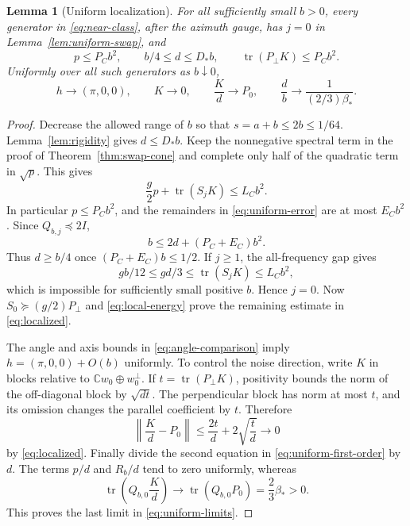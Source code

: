 \documentclass[11pt]{article}
\newtheorem{lemma}[theorem]{Lemma}
\theoremstyle{definition}
\theoremstyle{remark}
\DeclareMathOperator{\tr}{tr}
\newcommand{\C}{\mathbb C}
\begin{document}
\begin{lemma}[Uniform localization]\label{lem:localization}
For all sufficiently small \(b>0\), every generator in \eqref{eq:near-class}, after the azimuth gauge, has \(j=0\) in Lemma~\ref{lem:uniform-swap}, and
\begin{equation}\label{eq:localized}
 p\leq P_Cb^2,\qquad b/4\leq d\leq D_*b,\qquad
 \tr(P_\perp K)\leq P_Cb^2.
\end{equation}
Uniformly over all such generators as \(b\downarrow0\),
\begin{equation}\label{eq:uniform-limits}
 h\longrightarrow(\pi,0,0),\qquad
 K\longrightarrow0,\qquad
 \frac Kd\longrightarrow P_0,\qquad
 \frac db\longrightarrow\frac{1}{(2/3)\beta_*}.
\end{equation}
\end{lemma}
\begin{proof}
Decrease the allowed range of \(b\) so that \(s=a+b\leq2b\leq1/64\). Lemma~\ref{lem:rigidity} gives \(d\leq D_*b\). Keep the nonnegative spectral term in the proof of Theorem~\ref{thm:swap-cone} and complete only half of the quadratic term in \(\sqrt p\). This gives
\begin{equation}\label{eq:local-energy}
 \frac g2p+\tr(S_jK)\leq L_Cb^2.
\end{equation}
In particular \(p\leq P_Cb^2\), and the remainders in \eqref{eq:uniform-error} are at most \(E_Cb^2\). Since \(Q_{b,j}\preceq2I\),
\[
 b\leq2d+(P_C+E_C)b^2.
\]
Thus \(d\geq b/4\) once \((P_C+E_C)b\leq1/2\). If \(j\geq1\), the all-frequency gap gives
\[
 gb/12\leq gd/3\leq\tr(S_jK)\leq L_Cb^2,
\]
which is impossible for sufficiently small positive \(b\). Hence \(j=0\). Now \(S_0\succeq(g/2)P_\perp\) and \eqref{eq:local-energy} prove the remaining estimate in \eqref{eq:localized}.

The angle and axis bounds in \eqref{eq:angle-comparison} imply \(h=(\pi,0,0)+O(b)\) uniformly. To control the noise direction, write \(K\) in blocks relative to \(\C w_0\oplus w_0^\perp\). If \(t=\tr(P_\perp K)\), positivity bounds the norm of the off-diagonal block by \(\sqrt{dt}\). The perpendicular block has norm at most \(t\), and its omission changes the parallel coefficient by \(t\). Therefore
\[
 \left\|\frac Kd-P_0\right\|\leq\frac{2t}{d}+2\sqrt{\frac td}\longrightarrow0
\]
by \eqref{eq:localized}. Finally divide the second equation in \eqref{eq:uniform-first-order} by \(d\). The terms \(p/d\) and \(R_b/d\) tend to zero uniformly, whereas
\[
 \tr\left(Q_{b,0}\frac Kd\right)\longrightarrow
 \tr(Q_{b,0}P_0)=\frac23\beta_*>0.
\]
This proves the last limit in \eqref{eq:uniform-limits}.
\end{proof}
\end{document}
